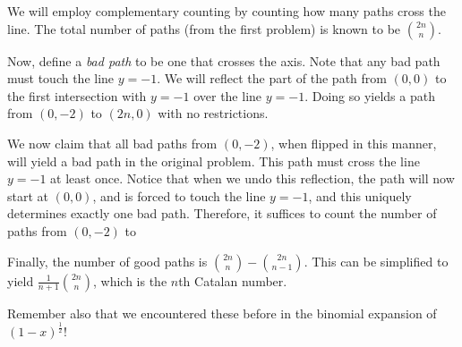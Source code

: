 \documentclass[11pt,twosided]{article}
\begin{document}
\begin{solution}
We will employ complementary counting by counting how many paths cross the line. The total number of paths (from the first problem) is known to be $\binom{2n}{n}$. 

Now, define a \textit{bad path} to be one that crosses the axis. Note that any bad path must touch the line $y = -1$. We will reflect the part of the path from $(0, 0)$ to the first intersection with $y = -1$ over the line $y = -1$. Doing so yields a path from $(0, -2)$ to $(2n, 0)$ with no restrictions. 

We now claim that all bad paths from $(0, -2)$, when flipped in this manner, will yield a bad path in the original problem. This path must cross the line $y = -1$ at least once. Notice that when we undo this reflection, the path will now start at $(0, 0)$, and is forced to touch the line $y = -1$, and this uniquely determines exactly one bad path. Therefore, it suffices to count the number of paths from $(0, -2)$ to 

Finally, the number of good paths is $\binom{2n}{n} - \binom{2n}{n-1}$. This can be simplified to yield $\frac{1}{n+1} \binom{2n}{n}$, which is the $n$th Catalan number. 
\end{solution}

Remember also that we encountered these before in the binomial expansion of $(1-x)^\frac{1}{2}$! 
\end{document}
